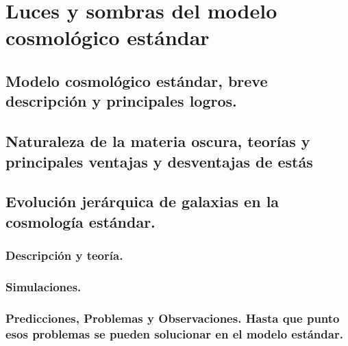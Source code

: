 
\chapter{Luces y sombras del modelo cosmológico estándar} %

\label{introduction} %


\newcommand{\keyword}[1]{\textbf{#1}}
\newcommand{\tabhead}[1]{\textbf{#1}}
\newcommand{\code}[1]{\texttt{#1}}
\newcommand{\file}[1]{\texttt{\bfseries#1}}
\newcommand{\option}[1]{\texttt{\itshape#1}}
\newcommand{\lcdm}{$\Lambda$CDM }


\section{Modelo cosmológico estándar, breve descripción y principales logros.}

\section{Naturaleza de la materia oscura, teorías y principales ventajas y desventajas de estás}

\section{Evolución jerárquica de galaxias en la cosmología estándar.}

\subsection{Descripción y teoría.}
\subsection{Simulaciones.}
\subsection{Predicciones, Problemas y Observaciones. Hasta que punto esos problemas se pueden solucionar en el modelo estándar.}

